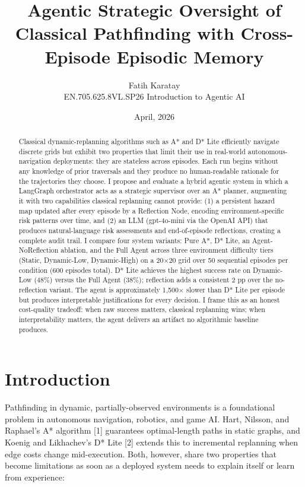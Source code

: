 \documentclass[11pt, letterpaper]{article}
\title{\textbf{Agentic Strategic Oversight of Classical Pathfinding with Cross-Episode Episodic Memory}\\[0.4em]
       \large }
\author{Fatih Karatay\\[0.2em]
        \small EN.705.625.8VL.SP26 Introduction to Agentic AI }
\date{April, 2026}
\begin{document}
\maketitle
\vspace{-2em}

\begin{abstract}
Classical dynamic-replanning algorithms such as A* and D* Lite efficiently navigate discrete grids but exhibit two properties that limit their use in real-world autonomous-navigation deployments: they are stateless across episodes. Each run begins without any knowledge of prior traversals and they produce no human-readable rationale for the trajectories they choose. I propose and evaluate a hybrid agentic system in which a LangGraph orchestrator acts as a strategic supervisor over an A* planner, augmenting it with two capabilities classical replanning cannot provide: (1) a persistent hazard map updated after every episode by a Reflection Node, encoding environment-specific risk patterns over time, and (2) an LLM (gpt-4o-mini via the OpenAI API) that produces natural-language risk assessments and end-of-episode reflections, creating a complete audit trail. I compare four system variants: Pure A*, D* Lite, an Agent-NoReflection ablation, and the Full Agent across three environment difficulty tiers (Static, Dynamic-Low, Dynamic-High) on a 20×20 grid over 50 sequential episodes per condition (600 episodes total). D* Lite achieves the highest success rate on Dynamic-Low (48\%) versus the Full Agent (38\%); reflection adds a consistent 2 pp over the no-reflection variant. The agent is approximately 1,500× slower than D* Lite per episode but produces interpretable justifications for every decision. I frame this as an honest cost-quality tradeoff: when raw success matters, classical replanning wins; when interpretability matters, the agent delivers an artifact no algorithmic baseline produces.
\end{abstract}

\section{Introduction}

Pathfinding in dynamic, partially-observed environments is a foundational problem in autonomous navigation, robotics, and game AI. Hart, Nilsson, and Raphael's A* algorithm [1] guarantees optimal-length paths in static graphs, and Koenig and Likhachev's D* Lite [2] extends this to incremental replanning when edge costs change mid-execution. Both, however, share two properties that become limitations as soon as a deployed system needs to explain itself or learn from experience:
\end{document}
